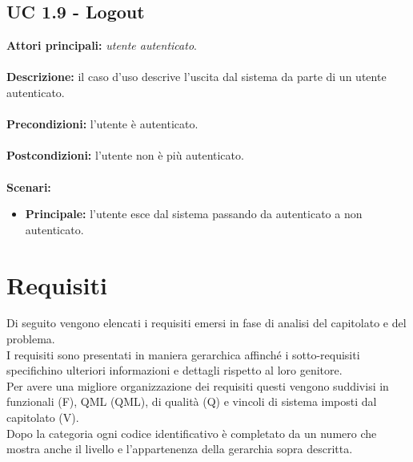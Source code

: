 \documentclass[a4paper,11pt]{article}
\begin{document}
\subsection{UC 1.9 - Logout}

\textbf{Attori principali:} \textit{utente autenticato}.\\
\\
\textbf{Descrizione:} il caso d'uso descrive l'uscita dal sistema da parte di un utente autenticato. \\
\\
\textbf{Precondizioni:} l'utente è autenticato. \\
\\
\textbf{Postcondizioni:} l'utente non è più autenticato. \\
\\
\textbf{Scenari:}
\begin{itemize}
\item \textbf{Principale:} l'utente esce dal sistema passando da autenticato a non autenticato.

\end{itemize}
	
	\newpage
	\section{Requisiti}
		Di seguito vengono elencati i requisiti emersi in fase di analisi del capitolato e del problema.\\
		I requisiti sono presentati in maniera gerarchica affinché i sotto-requisiti specifichino ulteriori informazioni e dettagli rispetto al loro genitore.\\
		Per avere una migliore organizzazione dei requisiti questi vengono suddivisi in funzionali (F), QML (QML), di qualità (Q) e vincoli di sistema imposti dal capitolato (V).\\
		Dopo la categoria ogni codice identificativo è completato da un numero che mostra anche il livello e l'appartenenza della gerarchia sopra descritta.\\
\end{document}
